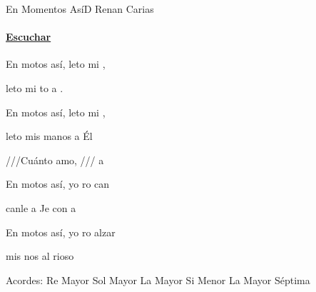 \documentclass[12pt, spanish]{book}
\begin{document}
    \begin{song}{En Momentos Así}{D}
    {} %
    {Renan Carias}
    {} %
    {}
        \ifChordBk
        \paragraph{\mbox{}\hfill\protect\href{https://open.spotify.com/intl-es/track/4TM3PwAYVklTfobZGmjVly}{Escuchar}\mbox{}\hfill}
        \fi

        \begin{SBOpGroup}
            En motos así, leto mi ,

            leto mi to a .

            En motos así, leto mi ,

            leto mis manos a Él
        \end{SBOpGroup}

        \begin{SBChorus}
            ///Cuánto  amo, ///  a
        \end{SBChorus}

        \begin{SBOpGroup}
            En motos así, yo ro can

            canle a Je con a

            En motos así, yo ro alzar

            mis nos al rioso 
        \end{SBOpGroup}

        \ifChordBk
        \begin{SBOpGroup}
            Acordes:
            \upchord{\D}\qquad Re Mayor \hfill
            \upchord{\G}\qquad Sol Mayor \hfill\null\break
            \upchord{\A}\qquad La Mayor \hfill
            \upchord{\Bm}\qquad Si Menor \hfill\null\break
            \upchord{\Aseven}La Mayor S\'eptima \hfill
        \end{SBOpGroup}
        \fi
    \end{song}
\end{document}
